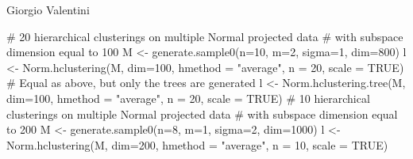 \documentclass{article}
\begin{document}
\begin{Author}\relax
Giorgio Valentini 
\end{Author}
\begin{SeeAlso}\relax
{}
\end{SeeAlso}
\begin{Examples}
\begin{ExampleCode}
# 20 hierarchical clusterings on multiple Normal projected data 
# with subspace dimension equal to 100
M <- generate.sample0(n=10, m=2, sigma=1, dim=800)
l <- Norm.hclustering(M, dim=100, hmethod = "average", n = 20, scale = TRUE)
# Equal as above, but only the trees are generated
l <- Norm.hclustering.tree(M, dim=100, hmethod = "average", n = 20, scale = TRUE)
# 10 hierarchical clusterings on multiple Normal projected data 
# with subspace dimension equal to 200
M <- generate.sample0(n=8, m=1, sigma=2, dim=1000)
l <- Norm.hclustering(M, dim=200, hmethod = "average", n = 10, scale = TRUE)
\end{ExampleCode}
\end{Examples}
\end{document}
